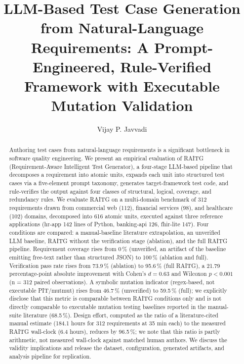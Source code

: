 \documentclass[sigconf,nonacm,review]{acmart}
\begin{document}
\title{LLM-Based Test Case Generation from Natural-Language Requirements: A Prompt-Engineered, Rule-Verified Framework with Executable Mutation Validation}

\author{Vijay P. Javvadi}

\renewcommand{\shortauthors}{Javvadi}

\begin{abstract}
\noindent Authoring test cases from natural-language requirements is a
significant bottleneck in software quality engineering. We present an
empirical evaluation of RAITG (Requirement-Aware Intelligent Test
Generator), a four-stage LLM-based pipeline that decomposes a
requirement into atomic units, expands each unit into structured test
cases via a five-element prompt taxonomy, generates target-framework
test code, and rule-verifies the output against four classes of
structural, logical, coverage, and redundancy rules. We evaluate RAITG
on a multi-domain benchmark of 312 requirements drawn from commercial
web (112), financial services (98), and healthcare (102) domains,
decomposed into 616 atomic units, executed against three reference
applications (hr-app 142 lines of Python, banking-api 126, fhir-lite
147). Four conditions are compared: a manual-baseline literature
extrapolation, an unverified LLM baseline, RAITG without the
verification stage (ablation), and the full RAITG pipeline.
Requirement coverage rises from 0\,\% (unverified, an artifact of the
baseline emitting free-text rather than structured JSON) to 100\,\%
(ablation and full). Verification pass rate rises from 73.9\,\%
(ablation) to 95.6\,\% (full RAITG), a 21.79 percentage-point absolute
improvement with Cohen's $d = 0.63$ and Wilcoxon $p < 0.001$ (n = 312
paired observations). A symbolic mutation indicator (regex-based, not
executable PIT/mutmut) rises from 46.7\,\% (unverified) to 59.5\,\%
(full); we explicitly disclose that this metric is comparable between
RAITG conditions only and is not directly comparable to executable
mutation testing baselines reported in the manual-suite literature
(68.5\,\%). Design effort, computed as the ratio of a literature-cited
manual estimate (184.1 hours for 312 requirements at 35 min each) to
the measured RAITG wall-clock (6.4 hours), reduces by 96.5\,\%; we note
that this ratio is partly arithmetic, not measured wall-clock against
matched human authors. We discuss the validity implications and
release the dataset, configuration, generated artifacts, and analysis
pipeline for replication.
\end{abstract}
\end{document}
